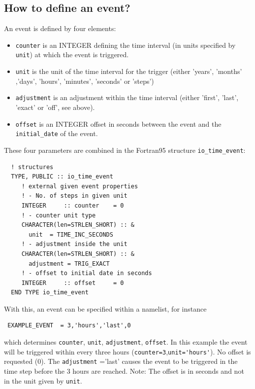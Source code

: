 \documentclass[twoside]{article}
\begin{document}
\subsection{How to define an event?}

An event is defined by four elements:
%
\begin{itemize}
\item \verb|counter| is an {\footnotesize INTEGER} defining the time interval
      (in units specified by \verb|unit|) at which the event is triggered.
\item \verb|unit| is the unit of the time interval for the trigger (either
      'years', 'months' ,'days', 'hours', 'minutes', 'seconds' or 'steps')
\item \verb|adjustment| is an adjustment within the time interval (either
      'first', 'last', 'exact' or 'off', see above).
\item \verb|offset| is an {\footnotesize INTEGER} offset in seconds between the
      event and the \verb|initial_date| of the event.
\end{itemize}
%
These four parameters are combined in the Fortran95 structure
\verb|io_time_event|:
%
\begin{verbatim}
  ! structures
  TYPE, PUBLIC :: io_time_event            
     ! external given event properties
     ! - No. of steps in given unit
     INTEGER     :: counter    = 0           
     ! - counter unit type
     CHARACTER(len=STRLEN_SHORT) :: &
       unit  = TIME_INC_SECONDS 
     ! - adjustment inside the unit
     CHARACTER(len=STRLEN_SHORT) :: &
       adjustment = TRIG_EXACT  
     ! - offset to initial date in seconds
     INTEGER     :: offset     = 0           
  END TYPE io_time_event
\end{verbatim}

With this, an event can be specified within a namelist, for instance
%
\begin{verbatim}
 EXAMPLE_EVENT  = 3,'hours','last',0  
\end{verbatim}
%
which determines \verb|counter|, \verb|unit|, \verb|adjustment|,
\verb|offset|. 
%
In this example the event will be triggered within every three hours
 (\verb|counter=3|,\verb|unit='hours'|). No offset is requested (0). The
\verb|adjustment| ='last' causes the event to be triggered in the time step 
before the 3 hours are reached.
Note: The offset is in seconds and not in the unit given by \verb|unit|.
\end{document}
